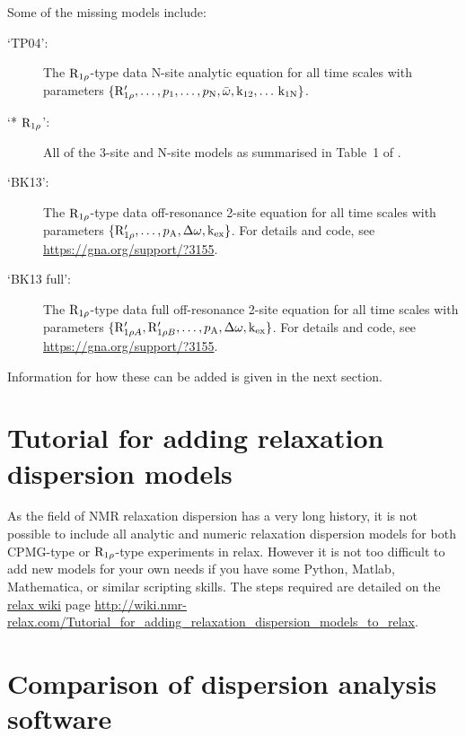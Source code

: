 Some of the missing models include:
\begin{description}
  \item[`TP04':]  The $\mathrm{R}_{1\rho}$-type data \citet{TrottPalmer04} N-site analytic equation for all time scales with parameters $\{\mathrm{R}_{1\rho}', \dots, p_{\textrm{1}}, \dots, p_{\textrm{N}}, \bar\omega, \textrm{k}_{\textrm{12}}, \dots\, \textrm{k}_{\textrm{1N}}\}$.
  \item[`* $\mathrm{R}_{1\rho}$':]  All of the 3-site and N-site models as summarised in Table~1 of \citet{PalmerMassi06}.
  \item[`BK13':]  The $\mathrm{R}_{1\rho}$-type data \citet{Baldwin2013} off-resonance 2-site equation for all time scales with parameters $\{\mathrm{R}_{1\rho}', \dots, p_{\textrm{A}}, \Delta\omega, \textrm{k}_{\textrm{ex}}\}$.  For details and code, see \url{https://gna.org/support/?3155}.
  \item[`BK13 full':]  The $\mathrm{R}_{1\rho}$-type data full \citet{Baldwin2013} off-resonance 2-site equation for all time scales with parameters $\{\mathrm{R}_{1\rho A}', \mathrm{R}_{1\rho B}', \dots, p_{\textrm{A}}, \Delta\omega, \textrm{k}_{\textrm{ex}}\}$.  For details and code, see \url{https://gna.org/support/?3155}.
\end{description}

Information for how these can be added is given in the next section.



\section{Tutorial for adding relaxation dispersion models}
\label{sect: dispersion: model tutorial}

As the field of NMR relaxation dispersion has a very long history, it is not possible to include all analytic and numeric relaxation dispersion models for both CPMG-type or $\mathrm{R}_{1\rho}$-type experiments in relax.
However it is not too difficult to add new models for your own needs if you have some Python, Matlab, Mathematica, or similar scripting skills.
The steps required are detailed on the \href{http://wiki.nmr-relax.com/}{relax wiki} page \url{http://wiki.nmr-relax.com/Tutorial\_for\_adding\_relaxation\_dispersion\_models\_to\_relax}.



\section{Comparison of dispersion analysis software}
\label{sect: dispersion: software comparison}

